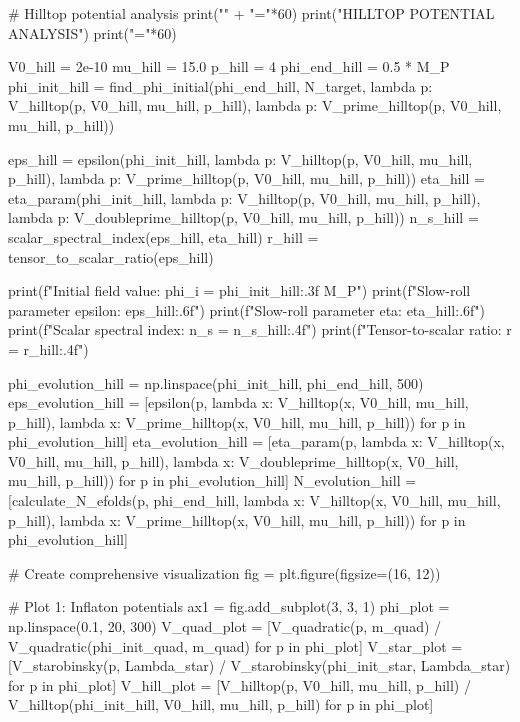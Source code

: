 \documentclass[a4paper, 11pt]{article}
\begin{document}
\begin{pycode}
# Hilltop potential analysis
print("\n" + "="*60)
print("HILLTOP POTENTIAL ANALYSIS")
print("="*60)

V0_hill = 2e-10
mu_hill = 15.0
p_hill = 4
phi_end_hill = 0.5 * M_P
phi_init_hill = find_phi_initial(phi_end_hill, N_target,
                                  lambda p: V_hilltop(p, V0_hill, mu_hill, p_hill),
                                  lambda p: V_prime_hilltop(p, V0_hill, mu_hill, p_hill))

eps_hill = epsilon(phi_init_hill,
                   lambda p: V_hilltop(p, V0_hill, mu_hill, p_hill),
                   lambda p: V_prime_hilltop(p, V0_hill, mu_hill, p_hill))
eta_hill = eta_param(phi_init_hill,
                      lambda p: V_hilltop(p, V0_hill, mu_hill, p_hill),
                      lambda p: V_doubleprime_hilltop(p, V0_hill, mu_hill, p_hill))
n_s_hill = scalar_spectral_index(eps_hill, eta_hill)
r_hill = tensor_to_scalar_ratio(eps_hill)

print(f"Initial field value: phi_i = {phi_init_hill:.3f} M_P")
print(f"Slow-roll parameter epsilon: {eps_hill:.6f}")
print(f"Slow-roll parameter eta: {eta_hill:.6f}")
print(f"Scalar spectral index: n_s = {n_s_hill:.4f}")
print(f"Tensor-to-scalar ratio: r = {r_hill:.4f}")

phi_evolution_hill = np.linspace(phi_init_hill, phi_end_hill, 500)
eps_evolution_hill = [epsilon(p, lambda x: V_hilltop(x, V0_hill, mu_hill, p_hill),
                               lambda x: V_prime_hilltop(x, V0_hill, mu_hill, p_hill))
                       for p in phi_evolution_hill]
eta_evolution_hill = [eta_param(p, lambda x: V_hilltop(x, V0_hill, mu_hill, p_hill),
                                 lambda x: V_doubleprime_hilltop(x, V0_hill, mu_hill, p_hill))
                       for p in phi_evolution_hill]
N_evolution_hill = [calculate_N_efolds(p, phi_end_hill,
                                        lambda x: V_hilltop(x, V0_hill, mu_hill, p_hill),
                                        lambda x: V_prime_hilltop(x, V0_hill, mu_hill, p_hill))
                     for p in phi_evolution_hill]

# Create comprehensive visualization
fig = plt.figure(figsize=(16, 12))

# Plot 1: Inflaton potentials
ax1 = fig.add_subplot(3, 3, 1)
phi_plot = np.linspace(0.1, 20, 300)
V_quad_plot = [V_quadratic(p, m_quad) / V_quadratic(phi_init_quad, m_quad) for p in phi_plot]
V_star_plot = [V_starobinsky(p, Lambda_star) / V_starobinsky(phi_init_star, Lambda_star)
               for p in phi_plot]
V_hill_plot = [V_hilltop(p, V0_hill, mu_hill, p_hill) / V_hilltop(phi_init_hill, V0_hill, mu_hill, p_hill)
               for p in phi_plot]


\end{pycode}
\end{document}
